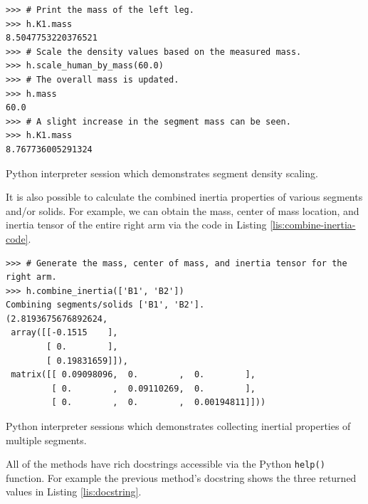 \documentclass[10pt,a4paper,twocolumn]{article}
\begin{document}
\begin{listing*}
  \begin{verbatim}
>>> # Print the mass of the left leg.
>>> h.K1.mass
8.5047753220376521
>>> # Scale the density values based on the measured mass.
>>> h.scale_human_by_mass(60.0)
>>> # The overall mass is updated.
>>> h.mass
60.0
>>> # A slight increase in the segment mass can be seen.
>>> h.K1.mass
8.767736005291324
  \end{verbatim}
  \caption{Python interpreter session which demonstrates segment density
    scaling.}
  \label{lis:mass-scale-code}
\end{listing*}

It is also possible to calculate the combined inertia properties of various
segments and/or solids. For example, we can obtain the mass, center of mass
location, and inertia tensor of the entire right arm via the code in Listing
\ref{lis:combine-inertia-code}.

\begin{listing*}
  \begin{verbatim}
>>> # Generate the mass, center of mass, and inertia tensor for the right arm.
>>> h.combine_inertia(['B1', 'B2'])
Combining segments/solids ['B1', 'B2'].
(2.8193675676892624,
 array([[-0.1515    ],
        [ 0.        ],
        [ 0.19831659]]),
 matrix([[ 0.09098096,  0.        ,  0.        ],
         [ 0.        ,  0.09110269,  0.        ],
         [ 0.        ,  0.        ,  0.00194811]]))
  \end{verbatim}
  \caption{Python interpreter sessions which demonstrates collecting inertial
    properties of multiple segments.}
  \label{lis:combine-inertia-code}
\end{listing*}

All of the methods have rich docstrings accessible via the Python \verb+help()+
function. For example the previous method's docstring shows the three returned
values in Listing \ref{lis:docstring}.
\end{document}
